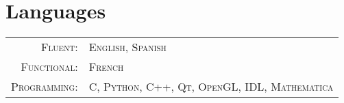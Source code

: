 \documentclass[10pt]{article} %
\begin{document}

\section{Languages}

\begin{tabular}{rl}
\textsc{Fluent:} & \textsc{English}, \textsc{Spanish} \\
\textsc{Functional:} & \textsc{French} \\
\textsc{Programming:} & \textsc{C, Python, C++, Qt, OpenGL, IDL, Mathematica} \\
\end{tabular}



\end{document}
